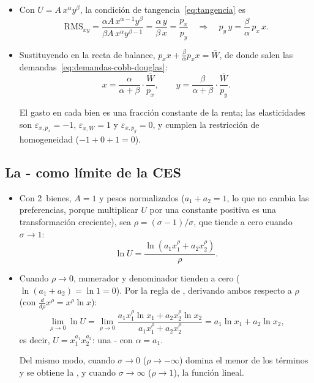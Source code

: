 \documentclass[11pt]{article}
\begin{document}
\begin{itemize}
\item Con $U=A\,x^{\alpha}y^{\beta}$, la condición de tangencia~\eqref{eq:tangencia} es
  \begin{equation*}
  \mathrm{RMS}_{xy}=\frac{\alpha A\,x^{\alpha-1}y^{\beta}}{\beta A\,x^{\alpha}y^{\beta-1}}=\frac{\alpha\,y}{\beta\,x}=\frac{p_x}{p_y}\quad\Longrightarrow\quad p_y\,y=\frac{\beta}{\alpha}\,p_x\,x.
  \end{equation*}
\item Sustituyendo en la recta de balance, $p_x x+\frac{\beta}{\alpha}p_x x=\overline{W}$, de donde salen las demandas~\eqref{eq:demandas-cobb-douglas}:
  \begin{equation*}
  x=\frac{\alpha}{\alpha+\beta}\cdot\frac{\overline{W}}{p_x},\qquad y=\frac{\beta}{\alpha+\beta}\cdot\frac{\overline{W}}{p_y}.
  \end{equation*}
  \findemo

  El gasto en cada bien es una fracción constante de la renta; las elasticidades son $\varepsilon_{x,p_x}=-1$, $\varepsilon_{x,\overline{W}}=1$ y $\varepsilon_{x,p_y}=0$, y cumplen la restricción de homogeneidad ($-1+0+1=0$).
\end{itemize}

\subsection{La - como límite de la CES}\label{der:ces}

\begin{itemize}
\item Con 2~bienes, $A=1$ y pesos normalizados ($a_1+a_2=1$, lo que no cambia las preferencias, porque multiplicar $U$ por una constante positiva es una transformación creciente), sea $\rho=(\sigma-1)/\sigma$, que tiende a cero cuando $\sigma\to 1$:
  \begin{equation*}
  \ln U=\frac{\ln\left(a_1x_1^{\rho}+a_2x_2^{\rho}\right)}{\rho}.
  \end{equation*}
\item Cuando $\rho\to 0$, numerador y denominador tienden a cero ($\ln(a_1+a_2)=\ln 1=0$). Por la regla de , derivando ambos respecto a $\rho$ (con $\frac{d}{d\rho}x^{\rho}=x^{\rho}\ln x$):
  \begin{equation*}
  \lim_{\rho\to 0}\ln U=\lim_{\rho\to 0}\frac{a_1x_1^{\rho}\ln x_1+a_2x_2^{\rho}\ln x_2}{a_1x_1^{\rho}+a_2x_2^{\rho}}=a_1\ln x_1+a_2\ln x_2,
  \end{equation*}
  es decir, $U=x_1^{a_1}x_2^{a_2}$: una - con $\alpha=a_1$\nocite{ArrowEtAl1961Capital}.\findemo

  Del mismo modo, cuando $\sigma\to 0$ ($\rho\to-\infty$) domina el menor de los términos y se obtiene la , y cuando $\sigma\to\infty$ ($\rho\to 1$), la función lineal.
\end{itemize}
\end{document}
